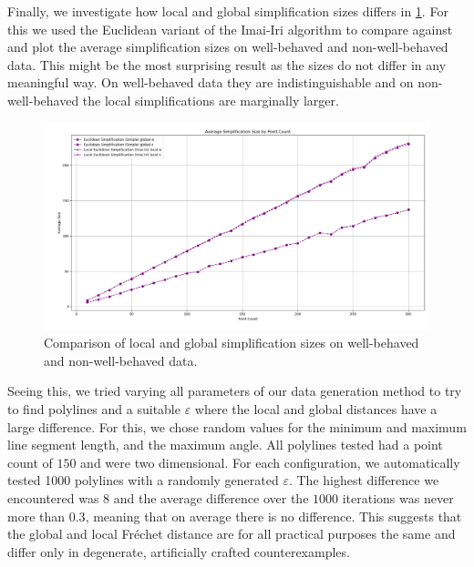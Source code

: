 Finally, we investigate how local and global simplification sizes differs in \cref{fig:res-local-global}. For this we used the Euclidean variant of the Imai-Iri algorithm to compare against and plot the average simplification sizes on well-behaved and non-well-behaved data. This might be the most surprising result as the sizes do not differ in any meaningful way. On well-behaved data they are indistinguishable and on non-well-behaved the local simplifications are marginally larger.

\begin{figure}[b]
  \centering
	\includegraphics[scale=0.4]{./figures/res_local_global.png}
  \caption{Comparison of local and global simplification sizes on well-behaved and non-well-behaved data.}
  \label{fig:res-local-global}
\end{figure}

Seeing this, we tried varying all parameters of our data generation method to try to find polylines and a suitable \(\varepsilon\) where the local and global distances have a large difference. For this, we chose random values for the minimum and maximum line segment length, and the maximum angle. All polylines tested had a point count of \(150\) and were two dimensional. For each configuration, we automatically tested 1000 polylines with a randomly generated \(\varepsilon\). The highest difference we encountered was \(8\) and the average difference over the \(1000\) iterations was never more than \(0.3\), meaning that on average there is no difference. This suggests that the global and local Fréchet distance are for all practical purposes the same and differ only in degenerate, artificially crafted counterexamples.
